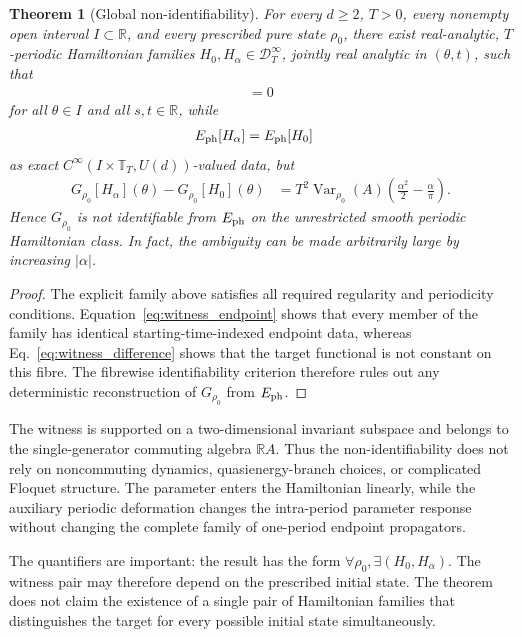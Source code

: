 \documentclass[twocolumn,prl,aps,floatfix]{revtex4-2}
\newtheorem{theorem}{Theorem}
\begin{document}
\begin{theorem}[Global non-identifiability]
For every $d\ge2$, $T>0$, every nonempty open interval $I\subset\mathbb R$, and every prescribed pure state $\rho_0$, there exist real-analytic, $T$-periodic Hamiltonian families
$H_0,H_\alpha\in\mathcal D_T^\infty$, jointly real analytic in $(\theta,t)$, such that
\begin{align}
[H_{\theta,\alpha}(t),H_{\theta,\alpha}(s)]=0
\end{align}
for all $\theta\in I$ and all $s,t\in\mathbb R$, while
\begin{align}
E_{\rm ph}[H_\alpha]
&=
E_{\rm ph}[H_0]
\end{align}
as exact $C^\infty(I\times\mathbb T_T,U(d))$-valued data, but
\begin{align}
G_{\rho_0}[H_\alpha](\theta)
-
G_{\rho_0}[H_0](\theta)
&=
T^2\operatorname{Var}_{\rho_0}(A)
\left(
\frac{\alpha^2}{2}-\frac{\alpha}{\pi}
\right).
\end{align}
Hence $G_{\rho_0}$ is not identifiable from $E_{\rm ph}$ on the unrestricted smooth periodic Hamiltonian class. In fact, the ambiguity can be made arbitrarily large by increasing $|\alpha|$.
\end{theorem}

\begin{proof}
The explicit family above satisfies all required regularity and periodicity conditions. Equation~\eqref{eq:witness_endpoint} shows that every member of the family has identical starting-time-indexed endpoint data, whereas Eq.~\eqref{eq:witness_difference} shows that the target functional is not constant on this fibre. The fibrewise identifiability criterion therefore rules out any deterministic reconstruction of $G_{\rho_0}$ from $E_{\rm ph}$.
\end{proof}

The witness is supported on a two-dimensional invariant subspace and belongs to the single-generator commuting algebra $\mathbb R A$. Thus the non-identifiability does not rely on noncommuting dynamics, quasienergy-branch choices, or complicated Floquet structure. The parameter enters the Hamiltonian linearly, while the auxiliary periodic deformation changes the intra-period parameter response without changing the complete family of one-period endpoint propagators.

The quantifiers are important: the result has the form
$\forall\rho_0,\exists(H_0,H_\alpha)$. The witness pair may therefore depend on the prescribed initial state. The theorem does not claim the existence of a single pair of Hamiltonian families that distinguishes the target for every possible initial state simultaneously.
\end{document}
